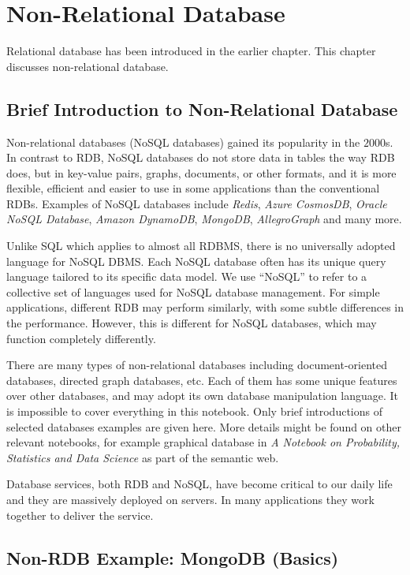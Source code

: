 \chapter{Non-Relational Database} 

Relational database has been introduced in the earlier chapter. This chapter discusses non-relational database.

\section{Brief Introduction to Non-Relational Database}

Non-relational databases (NoSQL databases) gained its popularity in the $2000$s. In contrast to RDB, NoSQL databases do not store data in tables the way RDB does, but in key-value pairs, graphs, documents, or other formats, and it is more flexible, efficient and easier to use in some applications than the conventional RDBs. Examples of NoSQL databases include \textit{Redis}, \textit{Azure CosmosDB}, \textit{Oracle NoSQL Database}, \textit{Amazon DynamoDB}, \textit{MongoDB}, \textit{AllegroGraph} and many more.

Unlike SQL which applies to almost all RDBMS, there is no universally adopted language for NoSQL DBMS. Each NoSQL database often has its unique query language tailored to its specific data model. We use ``NoSQL'' to refer to a collective set of languages used for NoSQL database management. For simple applications, different RDB may perform similarly, with some subtle differences in the performance. However, this is different for NoSQL databases, which may function completely differently.

There are many types of non-relational databases including document-oriented databases, directed graph databases, etc. Each of them has some unique features over other databases, and may adopt its own database manipulation language. It is impossible to cover everything in this notebook. Only brief introductions of selected databases examples are given here. More details might be found on other relevant notebooks, for example graphical database in \textit{A Notebook on Probability, Statistics and Data Science} as part of the semantic web.

Database services, both RDB and NoSQL, have become critical to our daily life and they are massively deployed on servers. In many applications they work together to deliver the service.

\section{Non-RDB Example: MongoDB (Basics)}

